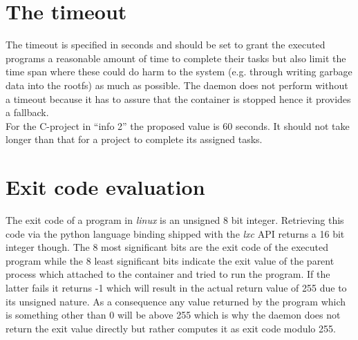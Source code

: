 \section{The timeout}

The timeout is specified in seconds and should be set to grant the executed programs a reasonable amount of time to complete
their tasks but also limit the time span where these could do harm to the system (e.g. through
writing garbage data into the rootfs) as much as possible. The daemon does not perform without
a timeout because it has to assure that the container is stopped hence it provides a fallback.\\
For the C-project in ``info 2'' the proposed value is 60 seconds. It should not take longer than that for a
project to complete its assigned tasks.

\section{Exit code evaluation}

The exit code of a program in \textit{linux} is an unsigned 8 bit integer. Retrieving this code via the python language binding
shipped with the \textit{lxc} API returns a 16 bit integer though. The 8
most significant bits are the exit code of the executed program while the 8 least significant bits indicate the exit
value of the parent process which attached to the container and tried to run the program.
If the latter fails it returns -1 which will result in the actual return value of
255 due to its unsigned nature. As a consequence any value returned by the program which is something other than 0 will be
above 255 which is why the daemon does not return the exit value directly but rather computes it as exit code modulo
255.
